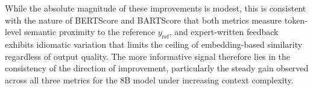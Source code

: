 \documentclass[conference,a4paper]{IEEEtran}
\begin{document}

\begin{table}[htbp]
\caption{Quantitative Evaluation Results (F1 Scores) per Variant}
\centering
\scriptsize
{}
\label{tab:quant_results}
\end{table}

While the absolute magnitude of these improvements 
is modest, this is consistent with the nature of 
BERTScore and BARTScore that both metrics measure 
token-level semantic proximity to the reference 
$y_{\text{ref}}$, and expert-written feedback 
exhibits idiomatic variation that limits the 
ceiling of embedding-based similarity regardless 
of output quality. The more informative signal 
therefore lies in the consistency of the direction 
of improvement, particularly the steady gain 
observed across all three metrics for the 8B model 
under increasing context complexity.

\end{document}

